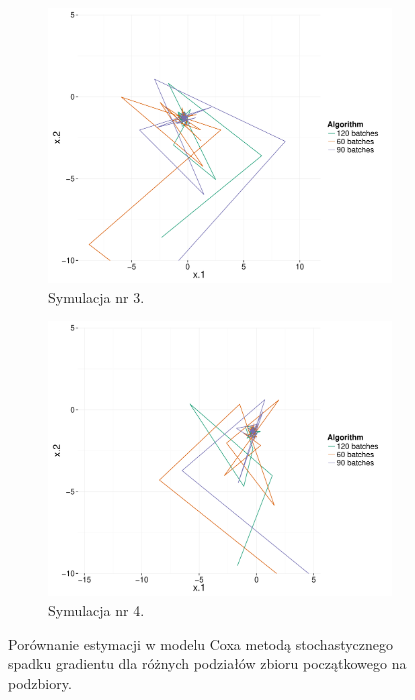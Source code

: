 \begin{figure}[hbt!]
\begin{center}
      \begin{subfigure}[h!]{0.45\textwidth}
         \includegraphics[width=\textwidth]{Obrazki/plot3_cox.pdf}
         \caption{Symulacja nr 3.}
      \end{subfigure}  
            \begin{subfigure}[h!]{0.45\textwidth}
               \includegraphics[width=\textwidth]{Obrazki/plot4_cox.pdf}
               \caption{Symulacja nr 4.}
            \end{subfigure}  
      \end{center}
  \caption[Porównanie estymacji w modelu Coxa metodą stochastycznego spadku gradientu dla różnych podziałów zbioru początkowego na podzbiory.]{\label{rysCox}Porównanie estymacji w modelu Coxa metodą stochastycznego spadku gradientu dla różnych podziałów zbioru początkowego na podzbiory.}
\end{figure}
	